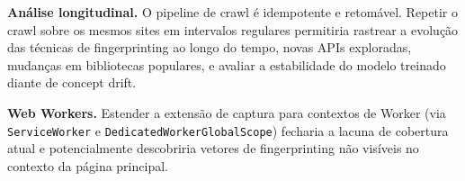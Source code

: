 \textbf{Análise longitudinal.} O pipeline de crawl é idempotente e
retomável. Repetir o crawl sobre os mesmos sites em intervalos regulares
permitiria rastrear a evolução das técnicas de fingerprinting ao longo do
tempo, novas APIs exploradas, mudanças em bibliotecas populares, e avaliar a
estabilidade do modelo treinado diante de concept drift.

\textbf{Web Workers.} Estender a extensão de captura para contextos de Worker (via
\texttt{ServiceWorker} e \texttt{DedicatedWorkerGlobalScope}) fecharia a lacuna de
cobertura atual e potencialmente descobriria vetores de fingerprinting não
visíveis no contexto da página principal.
